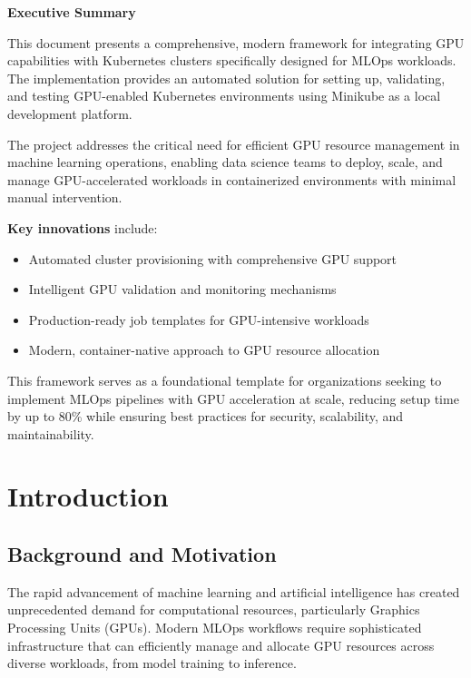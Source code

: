 \documentclass[12pt,a4paper]{report}
\begin{document}
\begin{center}
\textbf{Executive Summary}
\end{center}

\vspace{0.5cm}

This document presents a comprehensive, modern framework for integrating GPU capabilities with Kubernetes clusters specifically designed for MLOps workloads. The implementation provides an automated solution for setting up, validating, and testing GPU-enabled Kubernetes environments using Minikube as a local development platform.

The project addresses the critical need for efficient GPU resource management in machine learning operations, enabling data science teams to deploy, scale, and manage GPU-accelerated workloads in containerized environments with minimal manual intervention.

\textbf{Key innovations} include:
\begin{itemize}
    \item Automated cluster provisioning with comprehensive GPU support
    \item Intelligent GPU validation and monitoring mechanisms
    \item Production-ready job templates for GPU-intensive workloads
    \item Modern, container-native approach to GPU resource allocation
\end{itemize}

This framework serves as a foundational template for organizations seeking to implement MLOps pipelines with GPU acceleration at scale, reducing setup time by up to 80\% while ensuring best practices for security, scalability, and maintainability.

\chapter{Introduction}
\label{chap:introduction}

\section{Background and Motivation}
The rapid advancement of machine learning and artificial intelligence has created unprecedented demand for computational resources, particularly Graphics Processing Units (GPUs). Modern MLOps workflows require sophisticated infrastructure that can efficiently manage and allocate GPU resources across diverse workloads, from model training to inference.
\end{document}
